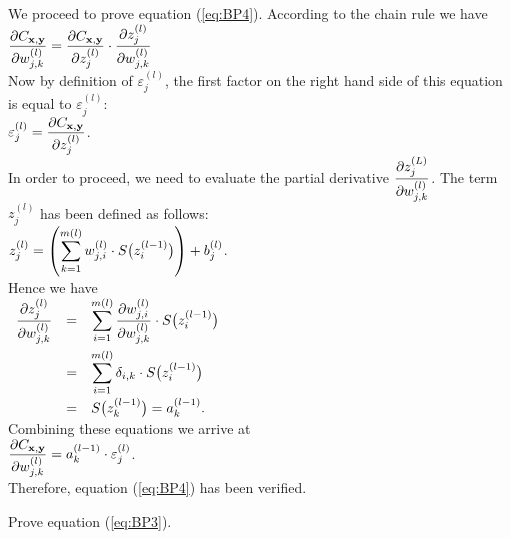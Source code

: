 We proceed to prove equation (\ref{eq:BP4}).  
According to the chain rule we have
\\[0.2cm]
\hspace*{1.3cm}
$ \displaystyle\frac{\partial C_{\mathbf{x}, \mathbf{y}}}{\partial w_{j,k}^{(l)}}  =  
  \frac{\partial C_{\mathbf{x}, \mathbf{y}}}{\partial z_j^{(l)}} \cdot \frac{\partial z_j^{(l)}}{\partial w_{j,k}^{(l)}} 
$ 
\\[0.2cm]
Now by definition of $\varepsilon_j^{(l)}$, the first factor on the right hand side of this equation is equal to $\varepsilon_j^{(l)}$: 
\\[0.2cm]
\hspace*{1.3cm}
$\displaystyle \varepsilon_j^{(l)} = \frac{\partial C_{\mathbf{x}, \mathbf{y}}}{\partial z_j^{(l)}}$.
\\[0.0cm]
In order to proceed, we need to evaluate the partial derivative
$\displaystyle\frac{\partial z_j^{(L)}}{\partial w_{j,k}^{(l)}}$.  The term $z_j^{(l)}$ has been defined as follows:
\\[0.2cm]
\hspace*{1.3cm}
$\displaystyle z_j^{(l)} = \left(\sum\limits_{k=1}^{m(l)} w_{j,i}^{(l)} \cdot S\bigl(z_i^{(l-1)}\bigr)\right) + b_j^{(l)}$.
\\[0.2cm]
Hence we have
\\[0.2cm]
\hspace*{1.3cm}
$
\begin{array}[t]{lcl}
        \displaystyle\frac{\partial z_j^{(l)}}{\partial w_{j,k}^{(l)}}
  & = & \displaystyle\sum\limits_{i=1}^{m(l)} \frac{\partial w_{j,i}^{(l)}}{\partial w_{j,k}^{(l)}} \cdot S\bigl(z_i^{(l-1)}\bigr) \\[0.5cm]
  & = & \displaystyle\sum\limits_{i=1}^{m(l)} \delta_{i,k}\cdot S\bigl(z_i^{(l-1)}\bigr) \\[0.4cm]
  & = & S\bigl(z_k^{(l-1)}\bigr) = a_k^{(l-1)}.
\end{array}
$
\\[0.2cm]
Combining these equations we arrive at
\\[0.2cm]
\hspace*{1.3cm}
$ \displaystyle\frac{\partial C_{\mathbf{x}, \mathbf{y}}}{\partial w_{j,k}^{(l)}}  =  
  a_k^{(l-1)} \cdot \varepsilon_j^{(l)} 
$. 
\\[0.2cm]
Therefore, equation (\ref{eq:BP4}) has been verified.

\exercise
Prove equation (\ref{eq:BP3}).
\eoxs


